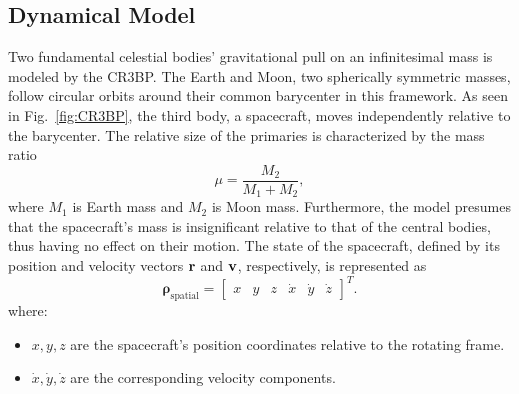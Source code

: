 \documentclass[conference]{IEEEtran}
\begin{document}
\subsection{Dynamical Model}
Two fundamental celestial bodies' gravitational pull on an infinitesimal mass is modeled by the CR3BP. The Earth and Moon, two spherically symmetric masses, follow circular orbits around their common barycenter in this framework. As seen in Fig.~\ref{fig:CR3BP}, the third body, a spacecraft, moves independently relative to the barycenter. The relative size of the primaries is characterized by the mass ratio
\begin{equation}
	\mu = \frac{M_2}{M_1 + M_2},
\end{equation}
where \( M_1 \) is Earth mass and \( M_2 \) is Moon mass.
Furthermore, the model presumes that the spacecraft's mass is insignificant relative to that of the central bodies, thus having no effect on their motion.
The state of the spacecraft, defined by its position and velocity vectors \( \vb{r}\) and \( \vb{v}\), respectively, is represented as
\begin{equation}
	\boldsymbol{\rho}_{\text{spatial}} = \begin{bmatrix} x & y & z & \dot{x} & \dot{y} & \dot{z} \end{bmatrix}^T.
\end{equation}
where:
\begin{itemize}
    \item \(x, y, z\) are the spacecraft's position coordinates relative to the rotating frame.
    \item \(\dot{x}, \dot{y}, \dot{z}\) are the corresponding velocity components.
\end{itemize}
\end{document}
